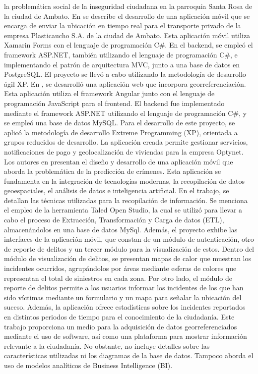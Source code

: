la problemática social de la inseguridad ciudadana en la parroquia Santa Rosa de la ciudad de Ambato.
\bigbreak
En \cite{lesanoperezAplicativoMovilGeoubicacion2022} se describe el desarrollo de una aplicación móvil que se encarga de enviar
la ubicación en tiempo real para el transporte privado de la empresa Plasticaucho S.A. de la ciudad de Ambato. Esta aplicación móvil
utiliza Xamarin Forms con el lenguaje de programación C\#. En el backend, se empleó el framework ASP.NET, también utilizando el lenguaje
de programación C\#, e implementando el patrón de arquitectura MVC, junto a una base de datos en PostgreSQL. El proyecto se llevó a
cabo utilizando la metodología de desarrollo ágil XP.
\bigbreak
En \cite{chicaizavillegasAplicacionWebPara2023}, se desarrolló una aplicación web que incorpora georreferenciación.
Esta aplicación utiliza el framework Angular junto con el lenguaje de programación JavaScript para el frontend. El backend fue
implementado mediante el framework ASP.NET utilizando el lenguaje de programación C\#, y se empleó una base de datos MySQL. Para
el desarrollo de este proyecto, se aplicó la metodología de desarrollo Extreme Programming (XP), orientada a grupos reducidos de
desarrollo. La aplicación creada permite gestionar servicios, notificaciones de pago y geolocalización de viviendas para la empresa
Optynet.
\bigbreak
Los autores en \cite{gomezcantilloAplicativoMovilPara} presentan el diseño y desarrollo de una aplicación móvil que aborda la
problemática de la predicción de crímenes. Esta aplicación se fundamenta en la integración de tecnologías modernas, la recopilación
de datos geoespaciales, el análisis de datos e inteligencia artificial. En el trabajo, se detallan las técnicas utilizadas para la
recopilación de información. Se menciona el empleo de la herramienta Taled Open Studio, la cual se utilizó para llevar a cabo el
proceso de Extracción, Transformación y Carga de datos (ETL), almacenándolos en una base de datos MySql. Además, el proyecto exhibe
las interfaces de la aplicación móvil, que constan de un módulo de autenticación, otro de reporte de delitos y un tercer módulo para
la visualización de estos. Dentro del módulo de visualización de delitos, se presentan mapas de calor que muestran los incidentes
ocurridos, agrupándolos por áreas mediante esferas de colores que representan el total de siniestros en cada zona. Por otro lado,
el módulo de reporte de delitos permite a los usuarios informar los incidentes de los que han sido víctimas mediante un formulario
y un mapa para señalar la ubicación del suceso. Además, la aplicación ofrece estadísticas sobre los incidentes reportados en distintos
periodos de tiempo para el conocimiento de la ciudadanía. Este trabajo proporciona un medio para la adquisición de datos georreferenciados
mediante el uso de software, así como una plataforma para mostrar información relevante a la ciudadanía. No obstante, no incluye detalles
sobre las características utilizadas ni los diagramas de la base de datos. Tampoco aborda el uso de modelos analíticos de Business
Intelligence (BI).
